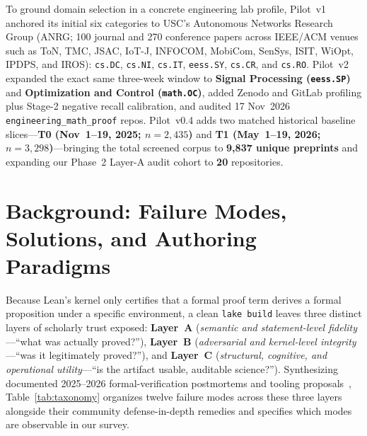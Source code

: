 \documentclass[11pt,letterpaper]{article}
\begin{document}
To ground domain selection in a concrete engineering lab profile, Pilot~v1 anchored its initial six categories to USC's Autonomous Networks Research Group (ANRG; 100 journal and 270 conference papers across IEEE/ACM venues such as ToN, TMC, JSAC, IoT-J, INFOCOM, MobiCom, SenSys, ISIT, WiOpt, IPDPS, and IROS): \texttt{cs.DC}, \texttt{cs.NI}, \texttt{cs.IT}, \texttt{eess.SY}, \texttt{cs.CR}, and \texttt{cs.RO}. Pilot~v2 expanded the exact same three-week window to \textbf{Signal Processing (\texttt{eess.SP})} and \textbf{Optimization and Control (\texttt{math.OC})}, added Zenodo and GitLab profiling plus Stage-2 negative recall calibration, and audited 17 Nov~2026 \texttt{engineering\_math\_proof} repos. Pilot~v0.4 adds two matched historical baseline slices---\textbf{T0 (Nov~1--19, 2025; $n=2{,}435$)} and \textbf{T1 (May~1--19, 2026; $n=3{,}298$)}---bringing the total screened corpus to \textbf{9,837 unique preprints} and expanding our Phase~2 Layer-A audit cohort to \textbf{20} repositories.

\section{Background: Failure Modes, Solutions, and Authoring Paradigms}
\label{sec:taxonomy}

Because Lean's kernel only certifies that a formal proof term derives a formal proposition under a specific environment, a clean \texttt{lake build} leaves three distinct layers of scholarly trust exposed: \textbf{Layer~A} (\emph{semantic and statement-level fidelity}---``what was actually proved?''), \textbf{Layer~B} (\emph{adversarial and kernel-level integrity}---``was it legitimately proved?''), and \textbf{Layer~C} (\emph{structural, cognitive, and operational utility}---``is the artifact usable, auditable science?''). Synthesizing documented 2025--2026 formal-verification postmortems and tooling proposals~\cite{bastounis2026navier,zhu2026leanarchitect,paglieri2026swarms,leanatlas2026,axle2026,proofbridge2025}, Table~\ref{tab:taxonomy} organizes twelve failure modes across these three layers alongside their community defense-in-depth remedies and specifies which modes are observable in our survey.
\end{document}
